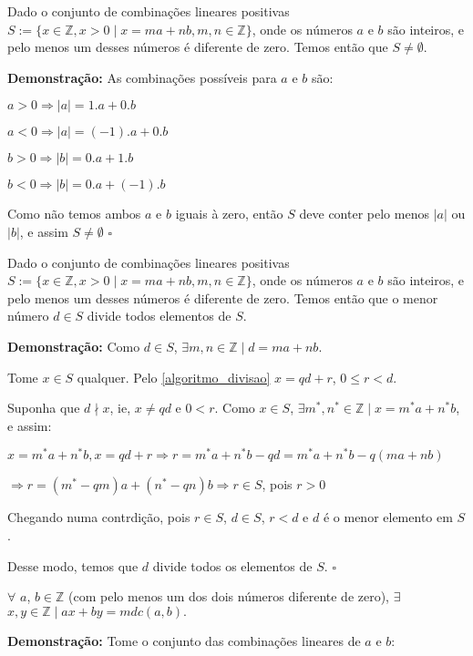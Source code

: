 \begin{corollary}\label{bezout_conjunto_nao_nulo}
Dado o conjunto de combinações lineares positivas $S := \{x\in\mathbb{Z}, x>0 \mid x = ma + nb, m,n\in \mathbb{Z}\}$, onde os números $a$ e $b$ são inteiros, 
e pelo menos um desses números é diferente de zero. Temos então que $S \neq \emptyset$. 
\end{corollary}
\textbf{Demonstração:}
As combinações possíveis para $a$ e $b$ são:

$a > 0 \Rightarrow |a| = 1.a + 0.b$

$a < 0 \Rightarrow |a| = (-1).a + 0.b$

$b > 0 \Rightarrow |b| = 0.a + 1.b$

$b < 0 \Rightarrow |b| = 0.a + (-1).b$

Como não temos ambos $a$ e $b$ iguais à zero, então $S$ deve conter pelo menos $|a|$ ou $|b|$, e assim $S \neq \emptyset$ $\square$


\begin{corollary}\label{bezout_conjunto_divide}
Dado o conjunto de combinações lineares positivas $S := \{x\in\mathbb{Z}, x>0 \mid x = ma + nb, m,n\in \mathbb{Z}\}$, onde os números $a$ e $b$ são inteiros, 
e pelo menos um desses números é diferente de zero. Temos então que o menor número $d \in S$ divide todos elementos de $S$.
\end{corollary}
\textbf{Demonstração:}
Como $d \in S$, $\exists m,n\in\mathbb{Z} \mid d = ma + nb$.

Tome $x \in S$ qualquer. Pelo \autoref{algoritmo_divisao} $x = qd + r$, $0 \leq r < d$.

Suponha que $d\nmid x$, ie, $x \neq qd$ e $0 < r$. Como $x \in S$, $\exists m^*,n^*\in\mathbb{Z} \mid x = m^*a + n^*b$, e assim:

$x = m^*a + n^*b, x = qd + r \Rightarrow r = m^*a + n^*b - qd = m^*a + n^*b - q(ma + nb)$ 

$\Rightarrow r = (m^* - qm)a + (n^* - qn)b \Rightarrow r \in S$, pois $r > 0$

Chegando numa contrdição, pois $r \in S$, $d \in S$, $r < d$ e $d$ é o menor elemento em $S$.

Desse modo, temos que $d$ divide todos os elementos de $S$. $\square$


\begin{theorem}\label{teorema_bezout}
$\forall$ $a$, $b \in \mathbb{Z}$ (com pelo menos um dos dois números diferente de zero), $\exists$ $x, y \in \mathbb{Z} \mid ax + by = mdc(a, b).$
\end{theorem}
\textbf{Demonstração:}
Tome o conjunto das combinações lineares de $a$ e $b$:

